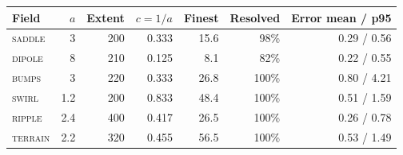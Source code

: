 \begin{center}\footnotesize
\begin{tabular}{@{}lrrrrrr@{}}
  \toprule
  Field & $a$ & Extent & $c=1/a$ & Finest & Resolved & Error mean / p95 \\
  \midrule
  \textsc{saddle} & 3 & 200 & 0.333 & 15.6 & 98\% & 0.29 / 0.56 \\
  \textsc{dipole} & 8 & 210 & 0.125 & 8.1 & 82\% & 0.22 / 0.55 \\
  \textsc{bumps} & 3 & 220 & 0.333 & 26.8 & 100\% & 0.80 / 4.21 \\
  \textsc{swirl} & 1.2 & 200 & 0.833 & 48.4 & 100\% & 0.51 / 1.59 \\
  \textsc{ripple} & 2.4 & 400 & 0.417 & 26.5 & 100\% & 0.26 / 0.78 \\
  \textsc{terrain} & 2.2 & 320 & 0.455 & 56.5 & 100\% & 0.53 / 1.49 \\
  \bottomrule
\end{tabular}
\end{center}
